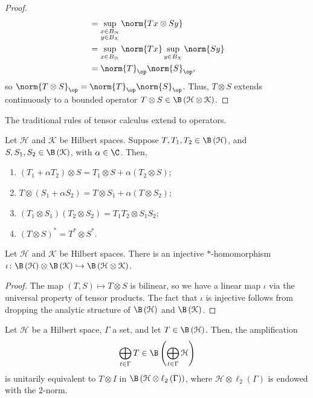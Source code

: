 \documentclass[10pt]{mypackage}
\begin{document}
\begin{proof}
\begin{align*}
                            &= \sup_{\substack{x\in B_{\mathcal{H}}\\y\in B_{\mathcal{K}}}}\norm{Tx\otimes Sy}\\
                            &= \sup_{x\in B_{\mathcal{H}}}\norm{Tx}\sup_{y\in B_{\mathcal{K}}}\norm{Sy}\\
                            &= \norm{T}_{\op}\norm{S}_{\op},
  \end{align*}
  so $\norm{T\otimes S}_{\op} = \norm{T}_{\op}\norm{S}_{\op}$. Thus, $T\otimes S$ extends continuously to a bounded operator $T\otimes S\in \B\left( \mathcal{H}\otimes \mathcal{K} \right)$.
\end{proof}
The traditional rules of tensor calculus extend to operators.
\begin{lemma}
  Let $\mathcal{H}$ and $\mathcal{K}$ be Hilbert spaces. Suppose $T,T_1,T_2\in\B\left( \mathcal{H} \right)$, and $S,S_1,S_2\in \B\left( \mathcal{K} \right)$, with $\alpha \in \C$. Then,
  \begin{enumerate}[(1)]
    \item $\left( T_1 + \alpha T_2 \right)\otimes S = T_1\otimes S + \alpha \left( T_2\otimes S \right)$;
    \item $T\otimes \left( S_1 + \alpha S_2 \right) = T\otimes S_1 + \alpha\left( T\otimes S_2 \right)$;
    \item $\left( T_1\otimes S_1 \right)\left( T_2\otimes S_2 \right) = T_1T_2\otimes S_1S_2$;
    \item $\left( T\otimes S \right)^{\ast} = T^{\ast}\otimes S^{\ast}$.
  \end{enumerate}
\end{lemma}
\begin{proposition}
  Let $\mathcal{H}$ and $\mathcal{K}$ be Hilbert spaces. There is an injective $\ast$-homomorphism $\iota\colon \B\left( \mathcal{H} \right)\otimes \B\left( \mathcal{K} \right) \hookrightarrow \B\left( \mathcal{H}\otimes \mathcal{K} \right)$.
\end{proposition}
\begin{proof}
  The map $\left( T,S \right)\mapsto T\otimes S$ is bilinear, so we have a linear map $\iota$ via the universal property of tensor products. The fact that $\iota$ is injective follows from dropping the analytic structure of $\B\left( \mathcal{H} \right)$ and $\B\left( \mathcal{K} \right)$.
\end{proof}
\begin{proposition}
  Let $\mathcal{H}$ be a Hilbert space, $\Gamma$ a set, and let $T\in \B\left( \mathcal{H} \right)$. Then, the amplification
  \begin{align*}
    \bigoplus_{t\in\Gamma}T\in \B\left( \bigoplus_{t\in\Gamma}\mathcal{H} \right)
  \end{align*}
  is unitarily equivalent to $T\otimes I$ in $\B\left( \mathcal{H}\otimes \ell_2\left( \Gamma \right) \right)$, where $\mathcal{H}\otimes \ell_2\left( \Gamma \right)$ is endowed with the $2$-norm.
\end{proposition}
\end{document}
